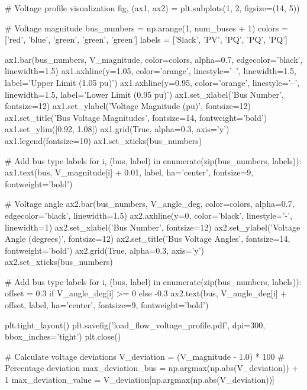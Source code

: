 \documentclass[11pt,a4paper]{article}
\begin{document}
\begin{pycode}
# Voltage profile visualization
fig, (ax1, ax2) = plt.subplots(1, 2, figsize=(14, 5))

# Voltage magnitude
bus_numbers = np.arange(1, num_buses + 1)
colors = ['red', 'blue', 'green', 'green', 'green']
labels = ['Slack', 'PV', 'PQ', 'PQ', 'PQ']

ax1.bar(bus_numbers, V_magnitude, color=colors, alpha=0.7, edgecolor='black', linewidth=1.5)
ax1.axhline(y=1.05, color='orange', linestyle='--', linewidth=1.5, label='Upper Limit (1.05 pu)')
ax1.axhline(y=0.95, color='orange', linestyle='--', linewidth=1.5, label='Lower Limit (0.95 pu)')
ax1.set_xlabel('Bus Number', fontsize=12)
ax1.set_ylabel('Voltage Magnitude (pu)', fontsize=12)
ax1.set_title('Bus Voltage Magnitudes', fontsize=14, fontweight='bold')
ax1.set_ylim([0.92, 1.08])
ax1.grid(True, alpha=0.3, axis='y')
ax1.legend(fontsize=10)
ax1.set_xticks(bus_numbers)

# Add bus type labels
for i, (bus, label) in enumerate(zip(bus_numbers, labels)):
    ax1.text(bus, V_magnitude[i] + 0.01, label, ha='center', fontsize=9, fontweight='bold')

# Voltage angle
ax2.bar(bus_numbers, V_angle_deg, color=colors, alpha=0.7, edgecolor='black', linewidth=1.5)
ax2.axhline(y=0, color='black', linestyle='-', linewidth=1)
ax2.set_xlabel('Bus Number', fontsize=12)
ax2.set_ylabel('Voltage Angle (degrees)', fontsize=12)
ax2.set_title('Bus Voltage Angles', fontsize=14, fontweight='bold')
ax2.grid(True, alpha=0.3, axis='y')
ax2.set_xticks(bus_numbers)

# Add bus type labels
for i, (bus, label) in enumerate(zip(bus_numbers, labels)):
    offset = 0.3 if V_angle_deg[i] >= 0 else -0.3
    ax2.text(bus, V_angle_deg[i] + offset, label, ha='center', fontsize=9, fontweight='bold')

plt.tight_layout()
plt.savefig('load_flow_voltage_profile.pdf', dpi=300, bbox_inches='tight')
plt.close()

# Calculate voltage deviations
V_deviation = (V_magnitude - 1.0) * 100  # Percentage deviation
max_deviation_bus = np.argmax(np.abs(V_deviation)) + 1
max_deviation_value = V_deviation[np.argmax(np.abs(V_deviation))]
\end{pycode}
\end{document}
